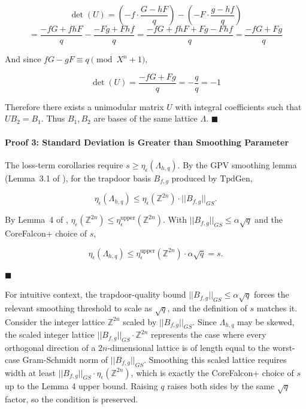 $$
\det(U) = (-f \cdot \frac{G - hF}{q}) - (-F \cdot \frac{g - hf}{q}) 
$$
$$
= \frac{-fG + fhF}{q} - \frac{-Fg + Fhf}{q} 
= \frac{-fG + fhF + Fg - Fhf}{q} = \frac{-fG + Fg}{q}
$$

And since $fG - gF \equiv q \pmod{X^n+1}$,

$$
\det(U) = \frac{-fG + Fg}{q} = - \frac{q}{q} = -1
$$

Therefore there exists a unimodular matrix $U$ with integral coefficients such that $UB_2 = B_1$. Thus $B_1, B_2$ are bases of the same lattice $\Lambda$. $\blacksquare$


\paragraph{Proof 3: Standard Deviation is Greater than Smoothing Parameter}\label{proof-3}

The loss-term corollaries require
\(s \ge \eta_\epsilon(\Lambda_{h,q})\). By the GPV smoothing lemma
(Lemma~3.1 of \cite{GPV2008}), for the trapdoor basis \(B_{f,g}\) produced by
\(\mathrm{TpdGen}\),

\[
\eta_\epsilon(\Lambda_{h,q}) \le \eta_\epsilon(\mathbb{Z}^{2n}) \cdot ||B_{f,g}||_{GS}.
\]

By Lemma~4 of \cite{Fouque2024CoreFalcon},
\(\eta_\epsilon(\mathbb{Z}^{2n}) \le \eta_\epsilon^{\mathrm{upper}}(\mathbb{Z}^{2n})\).
With \(||B_{f,g}||_{GS} \le \alpha\sqrt{q}\) and the CoreFalcon+ choice
of \(s\),

\[
\eta_\epsilon(\Lambda_{h,q})
\le
\eta_\epsilon^{\mathrm{upper}}(\mathbb{Z}^{2n}) \cdot \alpha\sqrt{q}
= s.
\]

$\blacksquare$

For intuitive context, the trapdoor-quality bound
\(||B_{f,g}||_{GS} \le \alpha\sqrt{q}\) forces the relevant smoothing
threshold to scale as \(\sqrt{q}\), and the definition of \(s\) matches
it. Consider the integer lattice \(\mathbb{Z}^{2n}\) scaled by
\(||B_{f,g}||_{GS}\). Since \(\Lambda_{h,q}\) may be skewed, the scaled
integer lattice \(||B_{f,g}||_{GS}\cdot \mathbb{Z}^{2n}\) represents the
case where every orthogonal direction of a \(2n\)-dimensional lattice is
of length equal to the worst-case Gram-Schmidt norm of
\(||B_{f,g}||_{GS}\). Smoothing this scaled lattice requires width at
least \(||B_{f,g}||_{GS} \cdot \eta_\epsilon(\mathbb{Z}^{2n})\), which
is exactly the CoreFalcon+ choice of \(s\) up to the Lemma 4 upper
bound. Raising \(q\) raises both sides by the same \(\sqrt{q}\) factor,
so the condition is preserved.

